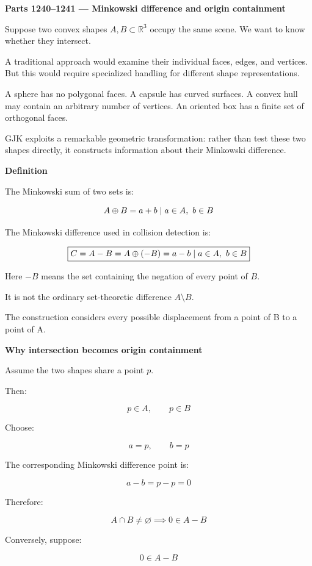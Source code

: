 \textbf{Parts 1240--1241 --- Minkowski difference and origin containment}

Suppose two convex shapes \(A,B\subset\mathbb R^3\) occupy the same scene. We want to know whether they intersect.

A traditional approach would examine their individual faces, edges, and vertices. But this would require specialized handling for different shape representations.

A sphere has no polygonal faces. A capsule has curved surfaces. A convex hull may contain an arbitrary number of vertices. An oriented box has a finite set of orthogonal faces.

GJK exploits a remarkable geometric transformation: rather than test these two shapes directly, it constructs information about their Minkowski difference.

\textbf{Definition}

The Minkowski sum of two sets is:

\[
A\oplus B=\\{a+b\mid a\in A,\ b\in B\\}
\]

The Minkowski difference used in collision detection is:

\[
\boxed{ C=A-B=A\oplus(-B)=\\{a-b\mid a\in A,\ b\in B\\} }
\]

Here \(-B\) means the set containing the negation of every point of \(B\).

It is not the ordinary set-theoretic difference \(A\setminus B\).

The construction considers every possible displacement from a point of B to a point of A.

\textbf{Why intersection becomes origin containment}

Assume the two shapes share a point \(p\).

Then:

\[
p\in A,\qquad p\in B
\]

Choose:

\[
a=p,\qquad b=p
\]

The corresponding Minkowski difference point is:

\[
a-b=p-p=0
\]

Therefore:

\[
A\cap B\ne\varnothing \implies 0\in A-B
\]

Conversely, suppose:

\[
0\in A-B
\]

